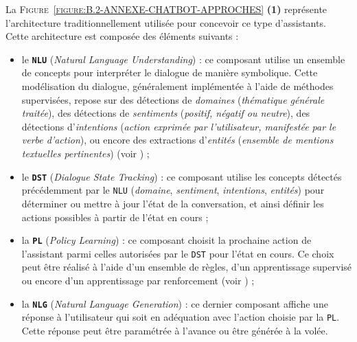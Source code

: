 			La \textsc{Figure~\ref{figure:B.2-ANNEXE-CHATBOT-APPROCHES}} \textbf{(1)} représente l'architecture traditionnellement utilisée pour concevoir ce type d'assistants.
			Cette architecture est composée des éléments suivants :
			\begin{itemize}
				\item le \textcolor{colorCarrotOrange}{\textbf{\texttt{NLU}}} (\textit{Natural Language Understanding}) :
					ce composant utilise un ensemble de concepts pour interpréter le dialogue de manière symbolique.
					Cette modélisation du dialogue, généralement implémentée à l'aide de méthodes supervisées, repose sur des détections de \textit{domaines} (\textit{thématique générale traitée}), des détections de \textit{sentiments} (\textit{positif, négatif ou neutre}), des détections d'\textit{intentions} (\textit{action exprimée par l'utilisateur, manifestée par le verbe d'action}), ou encore des extractions d'\textit{entités} (\textit{ensemble de mentions textuelles pertinentes}) (voir \cite{adamopoulou-moussiades:2020:overview-chatbot-technology}) ;
				\item le \textcolor{colorDarkPastelGreen}{\textbf{\texttt{DST}}} (\textit{Dialogue State Tracking}) :
					ce composant utilise les concepts détectés précédemment par le \texttt{NLU} (\textit{domaine}, \textit{sentiment}, \textit{intentions}, \textit{entités}) pour déterminer ou mettre à jour l'état de la conversation, et ainsi définir les actions possibles à partir de l'état en cours ;
				\item la \textcolor{colorDarkPastelGreen}{\textbf{\texttt{PL}}} (\textit{Policy Learning}) : 
					ce composant choisit la prochaine action de l'assistant parmi celles autorisées par le \texttt{DST} pour l'état en cours.
					Ce choix peut être réalisé à l'aide d'un ensemble de règles, d'un apprentissage supervisé ou encore d'un apprentissage par renforcement (voir \cite{brabra-etal:2022:dialogue-management-conversational}) ;
				\item la \textcolor{colorSilverLakeBlue}{\textbf{\texttt{NLG}}} (\textit{Natural Language Generation}) :
					ce dernier composant affiche une réponse à l'utilisateur qui soit en adéquation avec l'action choisie par la \texttt{PL}.
					Cette réponse peut être paramétrée à l'avance ou être générée à la volée.
			\end{itemize}
			
